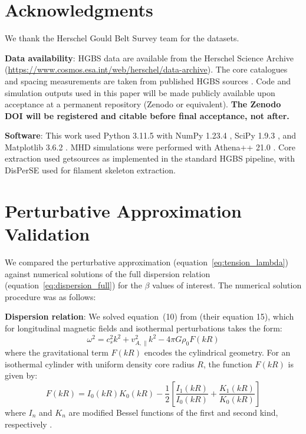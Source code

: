 \documentclass[11pt,a4paper]{article}
\begin{document}
\section*{Acknowledgments}

We thank the Herschel Gould Belt Survey team for the datasets.

\textbf{Data availability}: HGBS data are available from the Herschel Science Archive (\url{https://www.cosmos.esa.int/web/herschel/data-archive}). The core catalogues and spacing measurements are taken from published HGBS sources \citep{Konyves2015, Konyves2020, Andre2016}. Code and simulation outputs used in this paper will be made publicly available upon acceptance at a permanent repository (Zenodo or equivalent). \textbf{The Zenodo DOI will be registered and citable before final acceptance, not after.}

\textbf{Software}: This work used Python 3.11.5 \citep{Python2023} with NumPy 1.23.4 \citep{Harris2020}, SciPy 1.9.3 \citep{Virtanen2020}, and Matplotlib 3.6.2 \citep{Hunter2007}. MHD simulations were performed with Athena++ 21.0 \citep{Stone2020}. Core extraction used getsources \citep{Men'shchikov2012} as implemented in the standard HGBS pipeline, with DisPerSE \citep{Sousbie2011} used for filament skeleton extraction.

\appendix

\section{Perturbative Approximation Validation}
\label{app:perturbative_comparison}

We compared the perturbative approximation (equation~\ref{eq:tension_lambda}) against numerical solutions of the full dispersion relation (equation~\ref{eq:dispersion_full}) for the $\beta$ values of interest. The numerical solution procedure was as follows:

\textbf{Dispersion relation}: We solved equation~(10) from \citet{Nakamura1993} (their equation 15), which for longitudinal magnetic fields and isothermal perturbations takes the form:
\begin{equation}
\omega^2 = c_s^2 k^2 + v_{A,\parallel}^2 k^2 - 4\pi G\rho_0 F(kR)
\end{equation}
where the gravitational term $F(kR)$ encodes the cylindrical geometry. For an isothermal cylinder with uniform density core radius $R$, the function $F(kR)$ is given by:
\begin{equation}
F(kR) = I_0(kR)K_0(kR) - \frac{1}{2}\left[\frac{I_1(kR)}{I_0(kR)} + \frac{K_1(kR)}{K_0(kR)}\right]
\label{eq:FkR}
\end{equation}
where $I_n$ and $K_n$ are modified Bessel functions of the first and second kind, respectively \citep[Nakamura et al. 1993, equation 11]{Nakamura1993}.
\end{document}
